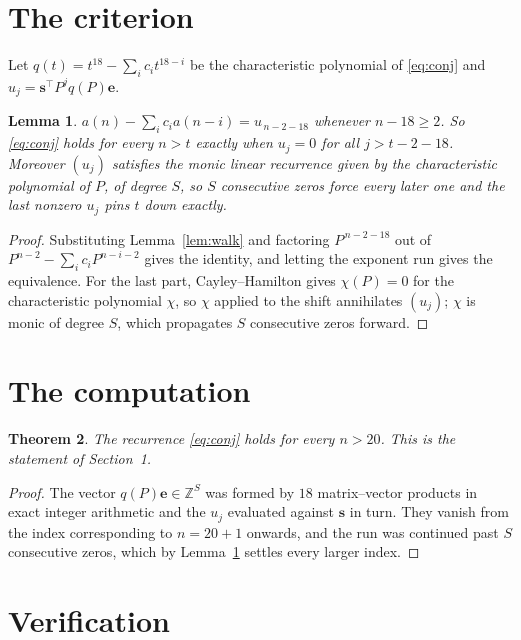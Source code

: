 \documentclass[11pt,a4paper]{article}
\theoremstyle{plain}
\newtheorem{theorem}{Theorem}
\newtheorem{lemma}[theorem]{Lemma}
\theoremstyle{definition}
\begin{document}
\section{The criterion}

Let $q(t)=t^{18}-\sum_i c_i t^{18-i}$ be the characteristic polynomial of
\eqref{eq:conj} and $u_j=\mathbf{s}^{\!\top}P^{j}q(P)\mathbf{e}$.

\begin{lemma}\label{lem:crit}
$a(n)-\sum_i c_i a(n-i)=u_{\,n-2-18}$ whenever $n-18\ge2$. So \eqref{eq:conj}
holds for every $n>t$ exactly when $u_j=0$ for all $j>t-2-18$. Moreover $(u_j)$
satisfies the monic linear recurrence given by the characteristic polynomial of $P$, of
degree $S$, so $S$ consecutive zeros force every later one and the last nonzero $u_j$ pins
$t$ down exactly.
\end{lemma}

\begin{proof}
Substituting Lemma~\ref{lem:walk} and factoring $P^{\,n-2-18}$ out of
$P^{n-2}-\sum_i c_i P^{n-i-2}$ gives the identity, and letting the exponent run gives the
equivalence. For the last part, Cayley--Hamilton gives $\chi(P)=0$ for the characteristic
polynomial $\chi$, so $\chi$ applied to the shift annihilates $(u_j)$; $\chi$ is monic of
degree $S$, which propagates $S$ consecutive zeros forward.
\end{proof}

\section{The computation}

\begin{theorem}
The recurrence \eqref{eq:conj} holds for every $n>20$. This is the statement of
Section~1.
\end{theorem}

\begin{proof}
The vector $q(P)\mathbf{e}\in\mathbb{Z}^{S}$ was formed by $18$ matrix--vector
products in exact integer arithmetic and the $u_j$ evaluated against $\mathbf{s}$ in turn.
They vanish from the index corresponding to $n=20+1$ onwards, and the run was continued
past $S$ consecutive zeros, which by Lemma~\ref{lem:crit} settles every larger index.
\end{proof}

\section{Verification}
\end{document}
